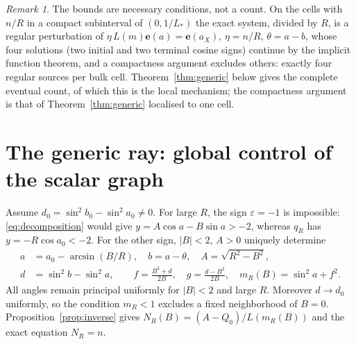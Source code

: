 \documentclass[11pt,a4paper]{article}
\theoremstyle{remark}\newtheorem{remark}[theorem]{Remark}
\newcommand{\ee}{\mathbf e}
\begin{document}
\begin{remark}
The bounds are necessary conditions, not a count.  On the cells with
$n/R$ in a compact subinterval of $(0,1/L_*)$ the exact system, divided by
$R$, is a regular perturbation of $\eta\,L(m)\ee(a)=\ee(a_X)$, $\eta=n/R$,
$\theta=a-b$, whose four solutions (two initial and two terminal cosine
signs) continue by the implicit function theorem, and a compactness
argument excludes others: exactly four regular sources per bulk cell.
Theorem~\ref{thm:generic} below gives the complete eventual count, of
which this is the local mechanism; the compactness argument is that of
Theorem~\ref{thm:generic} localised to one cell.
\end{remark}

\section{The generic ray: global control of the scalar graph}

Assume $d_0=\sin^2b_0-\sin^2a_0\ne0$.
For large $R$, the sign $\varepsilon=-1$ is impossible:
\eqref{eq:decomposition} would give $y=A\cos a-B\sin a>-2$,
whereas $q_R$ has $y=-R\cos a_0<-2$.
For the other sign, $|B|<2$, $A>0$ uniquely determine
\begin{equation}\label{eq:Bdata}
 \begin{split}
 a&=a_0-\arcsin(B/R),\quad b=a-\theta,\quad A=\sqrt{R^2-B^2},\\
 d&=\sin^2b-\sin^2a,\qquad
 f=\frac{B^2+d}{2B},\quad g=\frac{d-B^2}{2B},\quad
 m_R(B)=\sin^2a+f^2.
 \end{split}
\end{equation}
All angles remain principal uniformly for $|B|<2$ and large $R$.
Moreover $d\to d_0$ uniformly, so the condition $m_R<1$ excludes
a fixed neighborhood of $B=0$. Proposition~\ref{prop:inverse} gives
$N_R(B)=(A-Q_0)/L(m_R(B))$ and the exact equation $N_R=n$.
\end{document}
